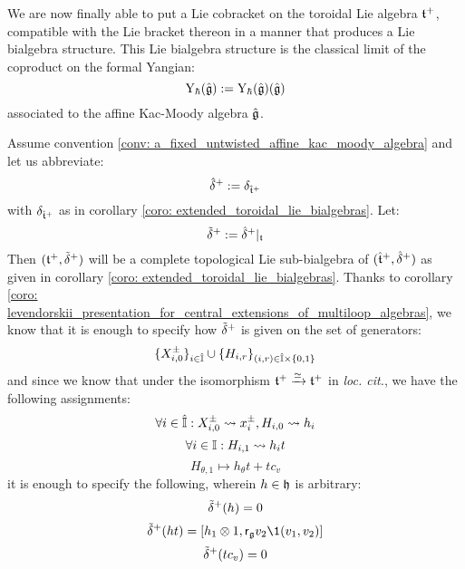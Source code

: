         We are now finally able to put a Lie cobracket on the toroidal Lie algebra $\mathfrak{t}^{+}$, compatible with the Lie bracket thereon in a manner that produces a Lie bialgebra structure. This Lie bialgebra structure is the classical limit of the coproduct on the formal Yangian:
            $$\mathrm{Y}_{\hbar}(\hat{\mathfrak{g}}) := \mathrm{Y}_{\hbar}(\hat{\mathfrak{g}})(\hat{\mathfrak{g}})$$
        associated to the affine Kac-Moody algebra $\hat{\mathfrak{g}}$. 
        \begin{theorem} \label{theorem: toroidal_lie_bialgebras}
            Assume convention \ref{conv: a_fixed_untwisted_affine_kac_moody_algebra} and let us abbreviate:
                $$\hat{\delta}^{+} := \delta_{\hat{\mathfrak{t}}^{+}}$$
            with $\delta_{\hat{\mathfrak{t}}^{+}}$ as in corollary \ref{coro: extended_toroidal_lie_bialgebras}. Let:
                $$\tilde{\delta}^{+} := \hat{\delta}^{+}|_{\mathfrak{t}}$$
            Then $(\mathfrak{t}^{+}, \tilde{\delta}^{+})$ will be a complete topological Lie sub-bialgebra of $(\hat{\mathfrak{t}}^{+}, \hat{\delta}^{+})$ as given in corollary \ref{coro: extended_toroidal_lie_bialgebras}. Thanks to corollary \ref{coro: levendorskii_presentation_for_central_extensions_of_multiloop_algebras}, we know that it is enough to specify how $\tilde{\delta}^{+}$ is given on the set of generators:
                $$\{X_{i, 0}^{\pm}\}_{i \in \hat{\simpleroots}} \cup \{H_{i, r}\}_{ (i, r) \in \hat{\simpleroots} \x \{0, 1\} }$$
            and since we know that under the isomorphism $\mathfrak{t}^+ \xrightarrow[]{\simeq} \mathfrak{t}^{+}$ in \textit{loc. cit.}, we have the following assignments:
                $$\forall i \in \hat{\mathbb{I}}: X_{i, 0}^{\pm} \leadsto x_i^{\pm}, H_{i, 0} \leadsto h_i$$
                $$\forall i \in \mathbb{I}: H_{i, 1} \leadsto h_i t$$
                $$H_{\theta, 1} \mapsto h_{\theta} t + t c_v$$
            it is enough to specify the following, wherein $h \in \mathfrak{h}$ is arbitrary:
                $$\tilde{\delta}^{+}(h) = 0$$
                $$\tilde{\delta}^{\positive}(ht) = [h_1 \tensor 1, \sfr_{\g} v_2 \1(v_1, v_2)]$$
                $$\tilde{\delta}^{+}(t c_v) = 0$$
        \end{theorem}
